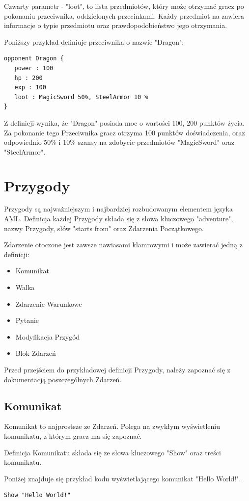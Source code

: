\documentclass	{xmgr}
\begin{document}
Czwarty parametr - "loot", to lista przedmiotów, który może otrzymać gracz po pokonaniu przeciwnika, oddzielonych przecinkami. Każdy przedmiot na zawiera informacje o typie przedmiotu oraz prawdopodobieństwo jego otrzymania.

Poniższy przykład definiuje przeciwnika o nazwie "Dragon":

\begin{lstlisting}
opponent Dragon {
   power : 100
   hp : 200
   exp : 100
   loot : MagicSword 50%, SteelArmor 10 %
}
\end{lstlisting}

Z definicji wynika, że "Dragon" posiada moc o wartości 100, 200 punktów życia. Za pokonanie tego Przeciwnika gracz otrzyma 100 punktów doświadczenia, oraz odpowiednio 50\% i 10\% szansy na zdobycie przedmiotów "MagicSword" oraz "SteelArmor".

\section{Przygody}
Przygody są najważniejszym i najbardziej rozbudowanym elementem języka AML. Definicja każdej Przygody składa się z słowa kluczowego "adventure", nazwy Przygody, słów "starts from" oraz Zdarzenia Początkowego.

Zdarzenie otoczone jest zawsze nawiasami klamrowymi i może zawierać jedną z definicji:
\begin{itemize}
	\item Komunikat
	\item Walka
	\item Zdarzenie Warunkowe
	\item Pytanie
	\item Modyfikacja Przygód
	\item Blok Zdarzeń
\end{itemize}

Przed przejściem do przykładowej definicji Przygody, należy zapoznać się z dokumentacją poszczególnych Zdarzeń.
\subsection{Komunikat}
Komunikat to najprostsze ze Zdarzeń. Polega na zwykłym wyświetleniu komunikatu, z którym gracz ma się zapoznać.

Definicja Komunikatu składa się ze słowa kluczowego "Show" oraz treści komunikatu.

Poniżej znajduje się przykład kodu wyświetlającego komunikat "Hello World!".
\begin{lstlisting}
Show "Hello World!"
\end{lstlisting}
\end{document}
